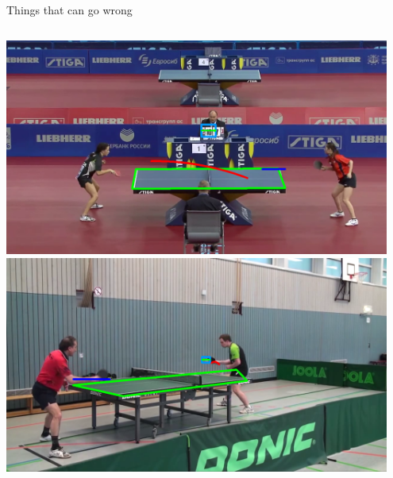 \documentclass{beamer}
\begin{document}
\begin{frame}
	Things that can go wrong
	\begin{columns}[onlytextwidth]
		\begin{column}{0.5\textwidth}
		\begin{center}
			\includegraphics[width=0.95\textwidth]{wrong1}\\
			\includegraphics[width=0.95\textwidth]{wrong2}\\
		\end{center}
		

\end{column}
\end{columns}
\end{frame}
\end{document}

